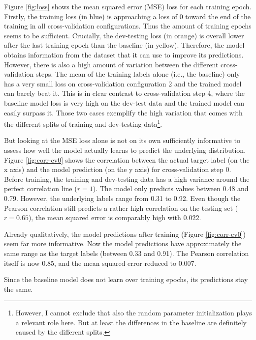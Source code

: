 \documentclass[11pt,a4paper]{article}
\begin{document}
Figure \ref{fig:loss} shows the mean squared error (MSE) loss for each training epoch. Firstly, the training loss (in blue) is approaching a loss of 0 toward the end of the training in all cross-validation configurations. Thus the amount of training epochs seems to be sufficient. Crucially, the dev-testing loss (in orange) is overall lower after the last training epoch than the baseline (in yellow). Therefore, the model obtains information from the dataset that it can use to improve its predictions. However, there is also a high amount of variation between the different cross-validation steps. The mean of the training labels alone (i.e., the baseline) only has a very small loss on cross-validation configuration 2 and the trained model can barely beat it. This is in clear contrast to cross-validation step 4, where the baseline model loss is very high on the dev-test data and the trained model can easily surpass it. Those two cases exemplify the high variation that comes with the different splits of training and dev-testing data\footnote{However, I cannot exclude that also the random parameter initialization plays a relevant role here. But at least the differences in the baseline are definitely caused by the different splits.}.

But looking at the MSE loss alone is not on its own sufficiently informative to assess how well the model actually learns to predict the underlying distribution. Figure \ref{fig:corr-cv0} shows the correlation between the actual target label (on the x axis) and the model prediction (on the y axis) for cross-validation step 0. Before training, the training and dev-testing data has a high variance around the perfect correlation line ($r=1$). The model only predicts values between 0.48 and 0.79. However, the underlying labels range from 0.31 to 0.92. Even though the Pearson correlation still predicts a rather high correlation on the testing set ($r=0.65$), the mean squared error is comparably high with $0.022$. 

Already qualitatively, the model predictions after training (Figure \ref{fig:corr-cv0}) seem far more informative. Now the model predictions have approximately the same range as the target labels (between 0.33 and 0.91). The Pearson correlation itself is now $0.85$, and the mean squared error reduced to $0.007$.

Since the baseline model does not learn over training epochs, its predictions stay the same.
\end{document}
